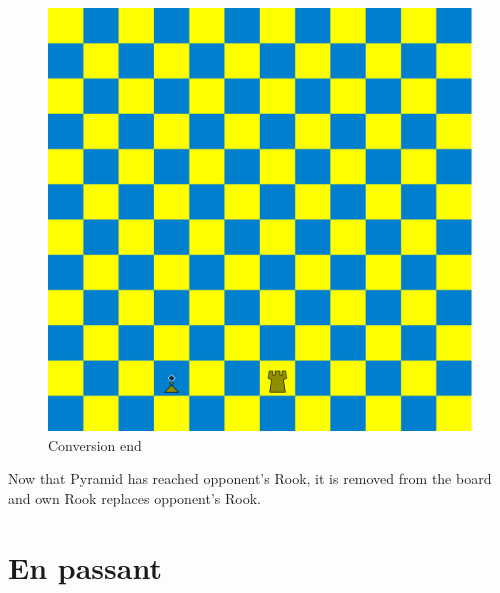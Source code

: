 \documentclass[a5paper,12pt,draft]{book} %
\begin{document}
\noindent
\begin{figure}[!h]
\includegraphics[width=1.0\textwidth, keepaspectratio=true]{../gfx/examples/09_move_pyramid_conversion_end.png}
\caption{Conversion end}
\label{fig:ma_conversion_end}
\end{figure}

Now that Pyramid has reached opponent's Rook, it is removed from the board and
own Rook replaces opponent's Rook.

\clearpage

\section*{En passant}
\end{document}
